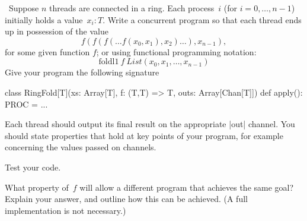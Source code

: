 \begin{question}
\Programming\ Suppose $n$ threads are connected in a ring.  Each process~$i$
(for $i = 0, \ldots, n-1$) initially holds a value~$x_i: T$.  Write a
concurrent program so that each thread ends up in possession of the value
\[
f(f(f(\ldots f(x_0, x_1), x_2) \ldots ), x_{n-1}),
\]
for some given function $f$; or using functional programming notation:
\[
\mathrm{foldl1}~f~ List(x_0, x_1, \ldots, x_{n-1})
\]
Give your program the following signature
%
\begin{scala}
class RingFold[T](xs: Array[T], f: (T,T) => T, outs: Array[Chan[T]]){
  def apply(): PROC = ...
}
\end{scala}
%
Each thread should output its final result on the appropriate |out| channel.
You should state properties that hold at key points of your program, for
example concerning the values passed on channels.

Test your code. 

What property of~$f$ will allow a different program that achieves the same
goal?  Explain your answer, and outline how this can be achieved.  (A full
implementation is not necessary.)
\end{question}


